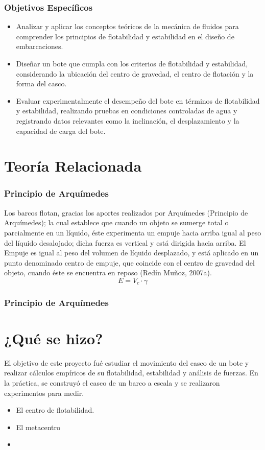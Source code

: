 \documentclass[a4paper,letterpaper]{article}
\begin{document}
\subsubsection*{Objetivos Específicos}
\begin{itemize}
	\item Analizar y aplicar los conceptos teóricos de la mecánica de fluidos para comprender los principios de flotabilidad y estabilidad en el diseño de embarcaciones.
	\item Diseñar un bote que cumpla con los criterios de flotabilidad y estabilidad, considerando la ubicación del centro de gravedad, el centro de flotación y la forma del casco.
	\item Evaluar experimentalmente el desempeño del bote en términos de flotabilidad y estabilidad, realizando pruebas en condiciones controladas de agua y registrando datos relevantes como la inclinación, el desplazamiento y la capacidad de carga del bote.
\end{itemize}
\newpage

\section*{Teoría Relacionada}
\subsubsection*{Principio de Arquímedes}
\setlength{\parindent}{18pt} 
Los barcos flotan, gracias los aportes realizados por Arquímedes (Principio de Arquímedes);
 la cual establece que cuando un objeto se sumerge total o parcialmente en un líquido, 
 éste experimenta un empuje hacia arriba igual al peso del líquido desalojado;
dicha fuerza es vertical y está dirigida hacia arriba. El Empuje es igual al peso del volumen de líquido desplazado, y 
está aplicado en un punto denominado centro de empuje, que coincide con el centro de gravedad del objeto, 
cuando éste se encuentra en reposo (Redín Muñoz, 2007a).
$$E=V_{c} \cdot \gamma $$

\subsubsection*{Principio de Arquímedes}





\newpage
\section*{¿Qué se hizo?}
El objetivo de este proyecto fué estudiar el movimiento del casco de un bote y realizar cálculos empíricos
de su flotabilidad, estabilidad y análisis de fuerzas. En la práctica, se construyó el casco de un barco a escala y se realizaron experimentos para medir. \begin{itemize}
	\item El centro de flotabilidad.
	\item El metacentro
	\item
\end{itemize}
\end{document}
